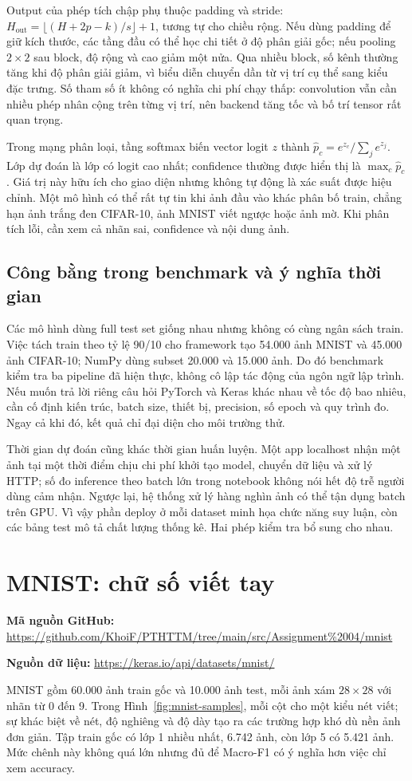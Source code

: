 \documentclass[12pt,a4paper]{report}
\newcommand{\datasetlink}[1]{\par\noindent\textbf{Nguồn dữ liệu: }\url{#1}\par}
\begin{document}
Output của phép tích chập phụ thuộc padding và stride: $H_{\mathrm{out}}=\lfloor(H+2p-k)/s\rfloor+1$, tương tự cho chiều rộng. Nếu dùng padding để giữ kích thước, các tầng đầu có thể học chi tiết ở độ phân giải gốc; nếu pooling $2\times2$ sau block, độ rộng và cao giảm một nửa. Qua nhiều block, số kênh thường tăng khi độ phân giải giảm, vì biểu diễn chuyển dần từ vị trí cụ thể sang kiểu đặc trưng. Số tham số ít không có nghĩa chi phí chạy thấp: convolution vẫn cần nhiều phép nhân cộng trên từng vị trí, nên backend tăng tốc và bố trí tensor rất quan trọng.

Trong mạng phân loại, tầng softmax biến vector logit $z$ thành $\hat p_c=e^{z_c}/\sum_j e^{z_j}$. Lớp dự đoán là lớp có logit cao nhất; confidence thường được hiển thị là $\max_c\hat p_c$. Giá trị này hữu ích cho giao diện nhưng không tự động là xác suất được hiệu chỉnh. Một mô hình có thể rất tự tin khi ảnh đầu vào khác phân bố train, chẳng hạn ảnh trắng đen CIFAR-10, ảnh MNIST viết ngược hoặc ảnh mờ. Khi phân tích lỗi, cần xem cả nhãn sai, confidence và nội dung ảnh.

\subsection{Công bằng trong benchmark và ý nghĩa thời gian}
Các mô hình dùng full test set giống nhau nhưng không có cùng ngân sách train. Việc tách train theo tỷ lệ 90/10 cho framework tạo 54.000 ảnh MNIST và 45.000 ảnh CIFAR-10; NumPy dùng subset 20.000 và 15.000 ảnh. Do đó benchmark kiểm tra ba pipeline đã hiện thực, không cô lập tác động của ngôn ngữ lập trình. Nếu muốn trả lời riêng câu hỏi PyTorch và Keras khác nhau về tốc độ bao nhiêu, cần cố định kiến trúc, batch size, thiết bị, precision, số epoch và quy trình đo. Ngay cả khi đó, kết quả chỉ đại diện cho môi trường thử.

Thời gian dự đoán cũng khác thời gian huấn luyện. Một app localhost nhận một ảnh tại một thời điểm chịu chi phí khởi tạo model, chuyển dữ liệu và xử lý HTTP; số đo inference theo batch lớn trong notebook không nói hết độ trễ người dùng cảm nhận. Ngược lại, hệ thống xử lý hàng nghìn ảnh có thể tận dụng batch trên GPU. Vì vậy phần deploy ở mỗi dataset minh họa chức năng suy luận, còn các bảng test mô tả chất lượng thống kê. Hai phép kiểm tra bổ sung cho nhau.

\section{MNIST: chữ số viết tay}
\noindent\textbf{Mã nguồn GitHub: }\url{https://github.com/KhoiF/PTHTTM/tree/main/src/Assignment%2004/mnist}\par
\datasetlink{https://keras.io/api/datasets/mnist/}
MNIST gồm 60.000 ảnh train gốc và 10.000 ảnh test, mỗi ảnh xám $28\times28$ với nhãn từ 0 đến 9. Trong Hình~\ref{fig:mnist-samples}, mỗi cột cho một kiểu nét viết; sự khác biệt về nét, độ nghiêng và độ dày tạo ra các trường hợp khó dù nền ảnh đơn giản. Tập train gốc có lớp 1 nhiều nhất, 6.742 ảnh, còn lớp 5 có 5.421 ảnh. Mức chênh này không quá lớn nhưng đủ để Macro-F1 có ý nghĩa hơn việc chỉ xem accuracy.
\end{document}
